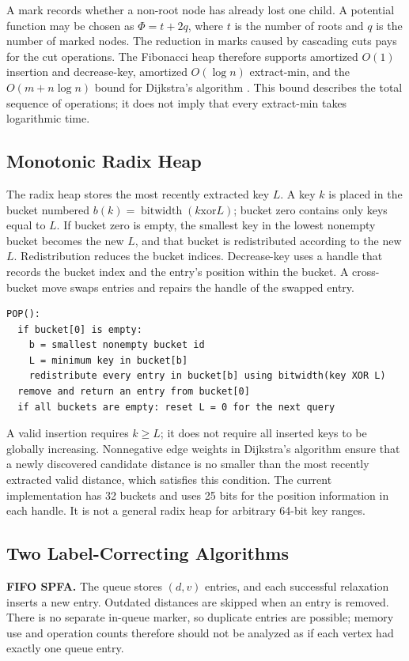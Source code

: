 A mark records whether a non-root node has already lost one child. A potential
function may be chosen as $\Phi=t+2q$, where $t$ is the number of roots and $q$ is
the number of marked nodes. The reduction in marks caused by cascading cuts pays
for the cut operations. The Fibonacci heap therefore supports amortized $O(1)$
insertion and decrease-key, amortized $O(\log n)$ extract-min, and the
$O(m+n\log n)$ bound for Dijkstra's algorithm \cite{fredman}. This bound describes
the total sequence of operations; it does not imply that every extract-min takes
logarithmic time.

\subsection{Monotonic Radix Heap}
The radix heap stores the most recently extracted key $L$. A key $k$ is placed in
the bucket numbered $b(k)=\operatorname{bitwidth}(k\mathbin{\mathrm{xor}}L)$; bucket
zero contains only keys equal to $L$. If bucket zero is empty, the smallest key in
the lowest nonempty bucket becomes the new $L$, and that bucket is redistributed
according to the new $L$. Redistribution reduces the bucket indices.
Decrease-key uses a handle that records the bucket index and the entry's position
within the bucket. A cross-bucket move swaps entries and repairs the handle of the
swapped entry.

\begin{lstlisting}[caption={Extract-min in the radix heap}]
POP():
  if bucket[0] is empty:
    b = smallest nonempty bucket id
    L = minimum key in bucket[b]
    redistribute every entry in bucket[b] using bitwidth(key XOR L)
  remove and return an entry from bucket[0]
  if all buckets are empty: reset L = 0 for the next query
\end{lstlisting}

A valid insertion requires $k\ge L$; it does not require all inserted keys to be
globally increasing. Nonnegative edge weights in Dijkstra's algorithm ensure that a
newly discovered candidate distance is no smaller than the most recently extracted
valid distance, which satisfies this condition. The current implementation has 32
buckets and uses 25 bits for the position information in each handle. It is not a
general radix heap for arbitrary 64-bit key ranges.

\subsection{Two Label-Correcting Algorithms}
\textbf{FIFO SPFA.} The queue stores $(d,v)$ entries, and each successful
relaxation inserts a new entry. Outdated distances are skipped when an entry is
removed. There is no separate in-queue marker, so duplicate entries are possible;
memory use and operation counts therefore should not be analyzed as if each vertex
had exactly one queue entry.

